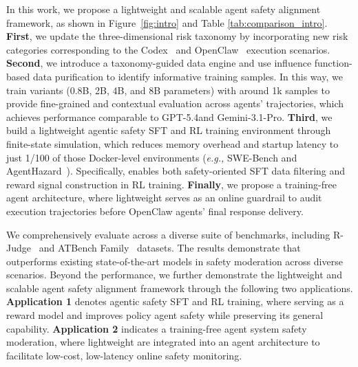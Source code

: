 In this work, we propose a lightweight and scalable agent safety alignment framework, as shown in Figure~\ref{fig:intro} and Table \ref{tab:comparison_intro}. \textbf{First}, we update the three-dimensional risk taxonomy \citep{liu2026agentdogdiagnosticguardrailframework, li2026atbench} by incorporating new risk categories corresponding to the Codex~\citep{openai_codex_2025} and OpenClaw~\citep{steinberger2026openclaw} execution scenarios. \textbf{Second}, we introduce a taxonomy-guided data engine and use influence function-based data purification to identify informative training samples. In this way, we train \agentdog{} variants (0.8B, 2B, 4B, and 8B parameters) with around 1k samples to provide fine-grained and contextual evaluation across agents’ trajectories, which achieves performance comparable to GPT-5.4and Gemini-3.1-Pro. \textbf{Third}, we build a lightweight agentic safety SFT and RL training environment through finite-state simulation, which reduces memory overhead and startup latency to just 1/100 of those Docker-level environments (\emph{e.g.,} SWE-Bench \citep{jimenez2024swe} and AgentHazard~\citep{feng2026agenthazard}). Specifically, \toolAG{} enables both safety-oriented SFT data filtering and reward signal construction in RL training. \textbf{Finally}, we propose a training-free agent architecture, where lightweight \agentdog{} serves as an online guardrail to audit execution trajectories before OpenClaw agents' final response delivery.


We comprehensively evaluate \agentdog{} across a diverse suite of benchmarks, including R-Judge~\citep{rjudge2024} and ATBench Family~\citep{li2026atbench} datasets. The results demonstrate that \agentdog{} outperforms existing state-of-the-art models in safety moderation across diverse scenarios. Beyond the performance, we further demonstrate the lightweight and scalable agent safety alignment framework through the following two applications. \textbf{Application 1} denotes agentic safety SFT and RL training, where  \agentdog{} serving as a reward model and improves policy agent safety while preserving its general capability. \textbf{Application 2} indicates a training-free agent system safety moderation, where lightweight \agentdog{} are integrated into an agent architecture to facilitate low-cost, low-latency online safety monitoring.



